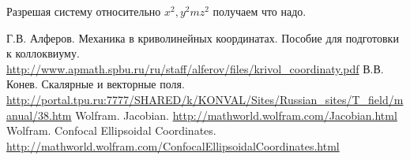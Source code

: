 \documentclass[12pt]{report}
\begin{document}
Разрешая систему относительно $x^2,y^2mz^2$ получаем что надо.

\begin{thebibliography}{0}
	Г.В. Алферов. Механика в криволинейных координатах. Пособие для подготовки к коллоквиуму.
	\url{http://www.apmath.spbu.ru/ru/staff/alferov/files/krivol_coordinaty.pdf}
	В.В. Конев. Скалярные и векторные поля.
	\url{http://portal.tpu.ru:7777/SHARED/k/KONVAL/Sites/Russian_sites/T_field/manual/38.htm}
	Wolfram. Jacobian.
	\url{http://mathworld.wolfram.com/Jacobian.html}
	Wolfram. Confocal Ellipsoidal Coordinates.
	\url{http://mathworld.wolfram.com/ConfocalEllipsoidalCoordinates.html}
\end{thebibliography}
\end{document}
